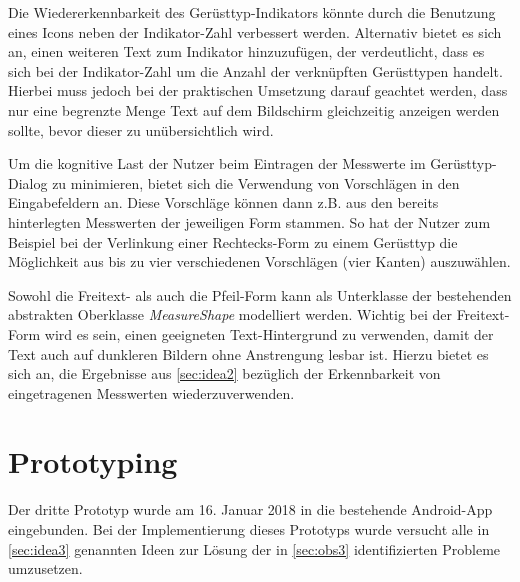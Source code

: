 Die Wiedererkennbarkeit des Gerüsttyp-Indikators könnte durch die Benutzung eines Icons neben der Indikator-Zahl verbessert werden.
Alternativ bietet es sich an, einen weiteren Text zum Indikator hinzuzufügen, der verdeutlicht, dass es sich bei der Indikator-Zahl um die Anzahl der verknüpften Gerüsttypen handelt.
Hierbei muss jedoch bei der praktischen Umsetzung darauf geachtet werden, dass nur eine begrenzte Menge Text auf dem Bildschirm gleichzeitig anzeigen werden sollte, bevor dieser zu unübersichtlich wird. \\

Um die kognitive Last der Nutzer beim Eintragen der Messwerte im Gerüsttyp-Dialog zu minimieren, bietet sich die Verwendung von Vorschlägen in den Eingabefeldern an.
Diese Vorschläge können dann z.B. aus den bereits hinterlegten Messwerten der jeweiligen Form stammen.
So hat der Nutzer zum Beispiel bei der Verlinkung einer Rechtecks-Form zu einem Gerüsttyp die Möglichkeit aus bis zu vier verschiedenen Vorschlägen (vier Kanten) auszuwählen.

Sowohl die Freitext- als auch die Pfeil-Form kann als Unterklasse der bestehenden abstrakten Oberklasse \emph{MeasureShape} modelliert werden.
Wichtig bei der Freitext-Form wird es sein, einen geeigneten Text-Hintergrund zu verwenden, damit der Text auch auf dunkleren Bildern ohne Anstrengung lesbar ist.
Hierzu bietet es sich an, die Ergebnisse aus \autoref{sec:idea2} bezüglich der Erkennbarkeit von eingetragenen Messwerten wiederzuverwenden.

\section{Prototyping}
Der dritte Prototyp wurde am 16. Januar 2018 in die bestehende Android-App eingebunden.
Bei der Implementierung dieses Prototyps wurde versucht alle in \autoref{sec:idea3} genannten Ideen zur Lösung der in \autoref{sec:obs3} identifizierten Probleme umzusetzen. \\

